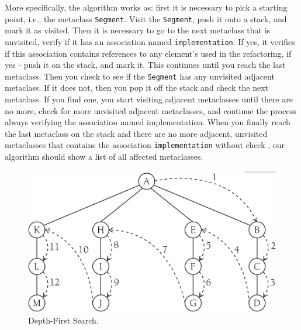 More specifically, the algorithm works as: first it is necessary to pick a starting point, i.e., the metaclass \texttt{Segment}. Visit the \texttt{Segment}, push it onto a stack, and mark it as visited. Then it is necessary to go to the next metaclass that is unvisited, verify if it has an association named \texttt{implementation}. If yes, it verifies if this association contains references to any element's used in the refactoring, if yes - push it on the stack, and mark it. This continues until you reach the last metaclass. Then you check to see if the \texttt{Segment} has any unvisited adjacent metaclass. If it does not, then you pop it off the stack and check the next metaclass. If you find one, you start visiting adjacent metaclasses until there are no more, check for more unvisited adjacent metaclasses, and continue the process always verifying the association named implementation. When you finally reach the last metaclass on the stack and there are no more adjacent, unvisited metaclasses that contains the association \texttt{implementation} without check , our algorithm should show a list of all affected metaclasses. 
%
%
%
%
%
%
%
%
%

\begin{figure}
	\centering
	\includegraphics[scale=0.2]{figuras/algWorks2}
	\caption{Depth-First Search.}
	\label{fig:algWorks2}
\end{figure}











